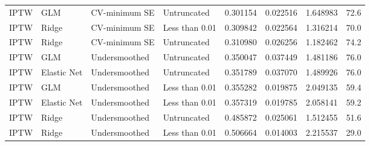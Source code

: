 \begin{longtable}[l]{llllllll}
IPTW & GLM & CV-minimum SE & Untruncated & 0.301154 & 0.022516 & 1.648983 & 72.6\\
IPTW & Ridge & CV-minimum SE & Less than 0.01 & 0.309842 & 0.022564 & 1.316214 & 70.0\\
IPTW & Ridge & CV-minimum SE & Untruncated & 0.310980 & 0.026256 & 1.182462 & 74.2\\
IPTW & GLM & Undersmoothed & Untruncated & 0.350047 & 0.037449 & 1.481186 & 76.0\\
IPTW & Elastic Net & Undersmoothed & Untruncated & 0.351789 & 0.037070 & 1.489926 & 76.0\\
IPTW & GLM & Undersmoothed & Less than 0.01 & 0.355282 & 0.019875 & 2.049135 & 59.4\\
IPTW & Elastic Net & Undersmoothed & Less than 0.01 & 0.357319 & 0.019785 & 2.058141 & 59.2\\
IPTW & Ridge & Undersmoothed & Untruncated & 0.485872 & 0.025061 & 1.512455 & 51.6\\
IPTW & Ridge & Undersmoothed & Less than 0.01 & 0.506664 & 0.014003 & 2.215537 & 29.0\\
\bottomrule
\end{longtable}
